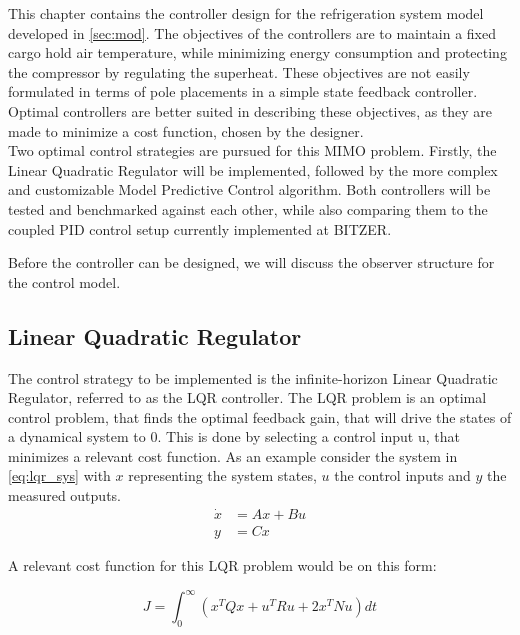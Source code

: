 This chapter contains the controller design for the refrigeration system model developed in \cref{sec:mod}. The objectives of the controllers are to maintain a fixed cargo hold air temperature, while minimizing energy consumption and protecting the compressor by regulating the superheat. These objectives are not easily formulated in terms of pole placements in a simple state feedback controller. Optimal controllers are better suited in describing these objectives, as they are made to minimize a cost function, chosen by the designer. \\

Two optimal control strategies are pursued for this MIMO problem. Firstly, the Linear Quadratic Regulator will be implemented, followed by the more complex and customizable Model Predictive Control algorithm. Both controllers will be tested and benchmarked against each other, while also comparing them to the coupled PID control setup currently implemented at BITZER.

Before the controller can be designed, we will discuss the observer structure for the control model.



\subsection{Linear Quadratic Regulator} \label{sec:linear-quadratic-regulator}
The control strategy to be implemented is the infinite-horizon Linear Quadratic Regulator, referred to as the LQR controller. The LQR problem is an optimal control problem, that finds the optimal feedback gain, that will drive the states of a dynamical system to 0. This is done by selecting a control input u, that minimizes a relevant cost function. As an example consider the system in \cref{eq:lqr_sys} with $x$ representing the system states, $u$ the control inputs and $y$ the measured outputs.\\

\begin{equation} \label{eq:lqr_sys}
	\begin{split}
		\dot{x} 	& = Ax + Bu \\
		y 	& = Cx
	\end{split}
\end{equation}

A relevant cost function for this LQR problem would be on this form:

\begin{equation} \label{eq:lqr_cost_fcn}
	J = \int_0^{\infty} \left(x^TQx + u^TRu + 2x^TNu\right)dt
\end{equation}

